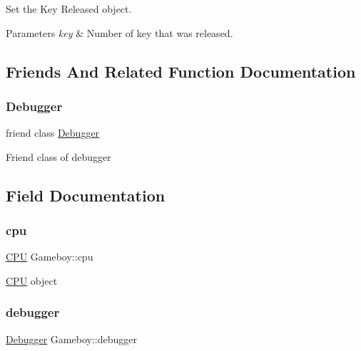Set the Key Released object. 


\begin{DoxyParams}{Parameters}
{\em key} & Number of key that was released. \\
\hline
\end{DoxyParams}


\subsection{Friends And Related Function Documentation}
\mbox{\label{classGameboy_af637948d2b98b924152a6f3bf5acdb6e}} 
\subsubsection{\texorpdfstring{Debugger}{Debugger}}
{\footnotesize\ttfamily friend class \mbox{\hyperlink{classDebugger}{Debugger}}\hspace{0.3cm}{\ttfamily [friend]}}

Friend class of debugger 

\subsection{Field Documentation}
\mbox{\label{classGameboy_a8efc19636204afd797a1fc3493bd2bce}} 
\subsubsection{\texorpdfstring{cpu}{cpu}}
{\footnotesize\ttfamily \mbox{\hyperlink{classCPU}{C\+PU}} Gameboy\+::cpu\hspace{0.3cm}{\ttfamily [private]}}

\mbox{\hyperlink{classCPU}{C\+PU}} object \mbox{\label{classGameboy_a284d695c0a40b955c520dab2e8ffd2be}} 
\subsubsection{\texorpdfstring{debugger}{debugger}}
{\footnotesize\ttfamily \mbox{\hyperlink{classDebugger}{Debugger}} Gameboy\+::debugger\hspace{0.3cm}{\ttfamily [private]}}

